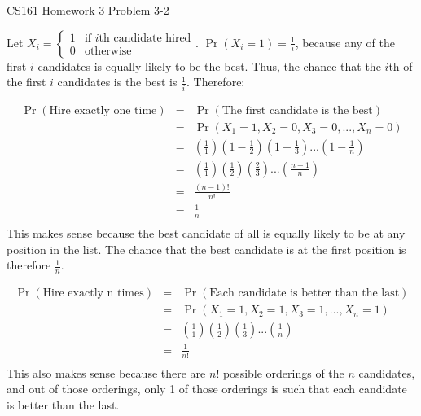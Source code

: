\documentclass[12pt]{article}
\begin{document}
\begin{center}
{\Large CS161 Homework 3 Problem 3-2}

\end{center}

Let $X_i  = \left\{\begin{array}{ll}1  & \mbox{if } i\text{th candidate hired} \\ 0 & \text{otherwise}\end{array}\right.$. $\Pr(X_i = 1) = \frac{1}{i}$, because any of the first $i$ candidates is equally likely to be the best. Thus, the chance that the $i$th of the first $i$ candidates is the best is $\frac{1}{i}$. Therefore:

\begin{eqnarray*}
\Pr(\text{Hire exactly one time}) &=& \Pr(\text{The first candidate is the best})\\
&=& \Pr(X_1 = 1, X_2 = 0, X_3 = 0, ..., X_n = 0)\\
&=& (\frac{1}{1}) (1 - \frac{1}{2}) (1 - \frac{1}{3}) ...  (1 - \frac{1}{n})\\
&=& (\frac{1}{1}) (\frac{1}{2}) (\frac{2}{3}) ...  (\frac{n-1}{n})\\
&=& \frac{(n-1)!}{n!}\\
&=& \frac{1}{n}\\
\end{eqnarray*}
This makes sense because the best candidate of all is equally likely to be at any position in the list. The chance that the best candidate is at the first position is therefore $\frac{1}{n}$. 

\begin{eqnarray*}
\Pr(\text{Hire exactly n times}) &=& \Pr(\text{Each candidate is better than the last})\\
&=& \Pr(X_1 = 1, X_2 = 1, X_3 = 1, ..., X_n = 1)\\
&=& (\frac{1}{1}) (\frac{1}{2}) (\frac{1}{3}) ...  (\frac{1}{n})\\
&=& \frac{1}{n!}\\
\end{eqnarray*}
This also makes sense because there are $n!$ possible orderings of the $n$ candidates, and out of those orderings, only 1 of those orderings is such that each candidate is better than the last. 
\end{document}
